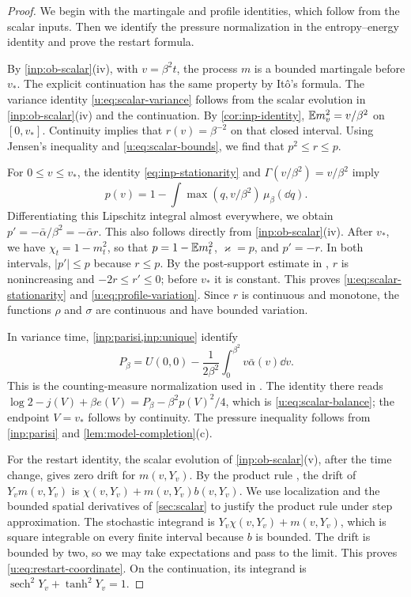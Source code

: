 \begin{proof}
We begin with the martingale and profile identities, which follow
from the scalar inputs. Then we identify the pressure normalization
in the entropy--energy identity and prove the restart formula.

By \cref{inp:ob-scalar}(iv), with $v=\beta^2t$, the process $m$ is a
bounded martingale before $v_*$. The explicit continuation has the
same property by It\^o's formula. The variance identity
\eqref{u:eq:scalar-variance} follows from the scalar evolution in
\cref{inp:ob-scalar}(iv) and the continuation. By
\cref{cor:inp-identity}, $\mathbb E m_v^2=v/\beta^2$ on $[0,v_*]$.
Continuity implies that $r(v)=\beta^{-2}$ on that closed interval.
Using Jensen's inequality and \eqref{u:eq:scalar-bounds}, we find
that $p^2\le r\le p$.

For $0\le v\le v_*$, the identity
\eqref{eq:inp-stationarity} and $\Gamma(v/\beta^2)=v/\beta^2$ imply
\begin{equation}\label{u:eq:mean-susceptibility}
 p(v)=1-\int\max(q,v/\beta^2)\,\mu_\beta(\dd q).
\end{equation}
Differentiating this Lipschitz integral almost everywhere, we obtain
$p'=-\bar\alpha/\beta^2=-\bar\alpha r$. This also follows directly
from \cref{inp:ob-scalar}(iv). After $v_*$, we have
$\chi_t=1-m_t^2$, so that $p=1-\mathbb E m_t^2$, $\varkappa=p$, and
$p'=-r$. In both intervals, $|p'|\le p$ because $r\le p$.
By the post-support estimate in \cite[Lemma~3]{oai-typical-upper},
$r$ is nonincreasing and $-2r\le r'\le0$; before
$v_*$ it is constant.
This proves \eqref{u:eq:scalar-stationarity} and
\eqref{u:eq:profile-variation}. Since $r$ is continuous and
monotone, the functions $\rho$ and $\sigma$ are continuous and have
bounded variation.

In variance time, \cref{inp:parisi,inp:unique} identify
\[
 P_\beta=U(0,0)-\frac1{2\beta^2}
                  \int_0^{\beta^2}v\bar\alpha(v)\dd v.
\]
This is the counting-measure normalization used in
\cite[Lemma~4]{oai-typical-upper}. The identity there reads
$\log2-j(V)+\beta e(V)=P_\beta-\beta^2p(V)^2/4$, which is
\eqref{u:eq:scalar-balance}; the endpoint $V=v_*$ follows by
continuity. The pressure inequality follows from \cref{inp:parisi}
and \cref{lem:model-completion}(c).

For the restart identity, the scalar evolution of
\cref{inp:ob-scalar}(v), after the time change, gives zero drift for
$m(v,Y_v)$. By the product rule \cite[Theorem~3.3.6]{karatzas-shreve-1991},
the drift of $Y_vm(v,Y_v)$ is $\chi(v,Y_v)+m(v,Y_v)b(v,Y_v)$. We use
localization and the bounded spatial derivatives of \cref{sec:scalar}
to justify the product rule under step approximation.
The stochastic integrand is $Y_v\chi(v,Y_v)+m(v,Y_v)$, which is
square integrable on every finite interval because $b$ is bounded.
The drift is bounded by two, so we may take expectations and pass
to the limit. This proves \eqref{u:eq:restart-coordinate}. On the
continuation, its
integrand is $\operatorname{sech}^2Y_v+\tanh^2Y_v=1$.
\end{proof}

